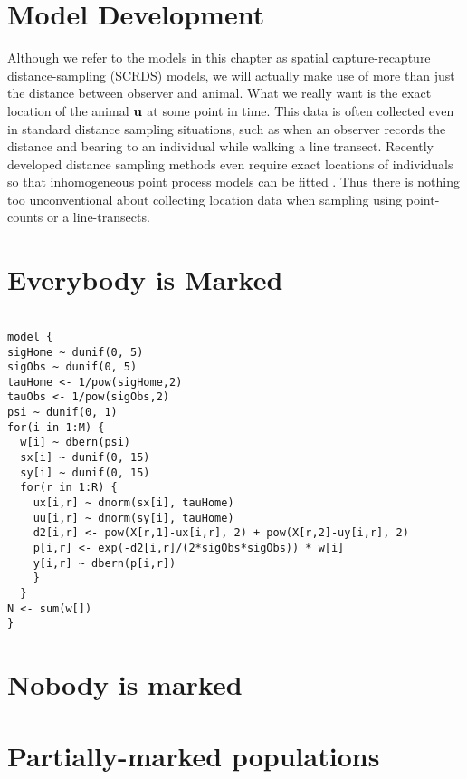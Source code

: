 \section{Model Development}

Although we refer to the models in this chapter as spatial
capture-recapture distance-sampling (SCRDS) models, we will actually
make use of more than just the distance between observer and
animal. What we really want is the exact location of the animal $\bf
u$ at some point in time. This data is often collected even in
standard distance sampling situations, such as when an observer
records the distance and bearing to an individual while walking a line
transect. Recently developed distance sampling methods even require
exact locations of individuals so that inhomogeneous point process
models can be fitted \citep{johnson_etal:2010}. Thus there is nothing
too unconventional about collecting location data when sampling using
point-counts or a line-transects.






\section{Everybody is Marked}



\begin{verbatim}

model {
sigHome ~ dunif(0, 5)
sigObs ~ dunif(0, 5)
tauHome <- 1/pow(sigHome,2)
tauObs <- 1/pow(sigObs,2)
psi ~ dunif(0, 1)
for(i in 1:M) {
  w[i] ~ dbern(psi)
  sx[i] ~ dunif(0, 15)
  sy[i] ~ dunif(0, 15)
  for(r in 1:R) {
    ux[i,r] ~ dnorm(sx[i], tauHome)
    uu[i,r] ~ dnorm(sy[i], tauHome)
    d2[i,r] <- pow(X[r,1]-ux[i,r], 2) + pow(X[r,2]-uy[i,r], 2)
    p[i,r] <- exp(-d2[i,r]/(2*sigObs*sigObs)) * w[i]
    y[i,r] ~ dbern(p[i,r])
    }
  }
N <- sum(w[])
}

\end{verbatim}







\section{Nobody is marked}





\section{Partially-marked populations}




